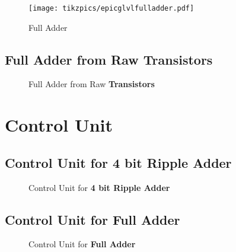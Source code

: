 \documentclass[a4paper, 10pt]{article}
\begin{document}
\begin{figure}[!hb]
	\centering
    \texttt{[image: tikzpics/epicglvlfulladder.pdf]}
	\caption{Full Adder}
\end{figure}

\clearpage

\subsection{Full Adder from Raw \textbf{Transistors}}

\begin{figure}[!h]
	\centering
	\caption{Full Adder from Raw \textbf{Transistors}}
\end{figure}

\clearpage

\section{Control Unit}

\subsection{Control Unit for 4 bit Ripple Adder}

\begin{figure}[!h]
    \centering
    \caption{Control Unit for \textbf{4 bit Ripple Adder}}
\end{figure}


\clearpage

\subsection{Control Unit for Full Adder}

\begin{figure}[!h]
	\centering
	\caption{Control Unit for \textbf{Full Adder}}
\end{figure}
\end{document}
